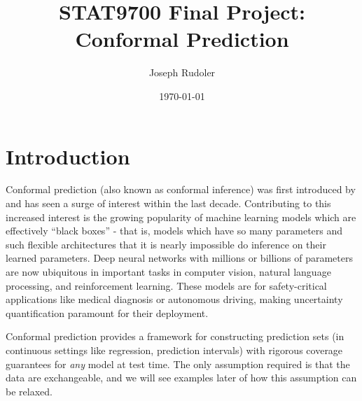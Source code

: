 \documentclass[a4paper, 12pt]{article}
\title{STAT9700 Final Project: Conformal Prediction}
\author{Joseph Rudoler}
\date{\today}
\begin{document}
\maketitle


\section{Introduction}
\label{sec:intro}
Conformal prediction (also known as conformal inference) was first introduced by \textcite{vovkMachineLearningApplicationsAlgorithmic1999} and has seen a surge of interest within the last decade. Contributing to this increased interest is the growing popularity of machine learning models which are effectively ``black boxes'' - that is, models which have so many parameters and such flexible architectures that it is nearly impossible do inference on their learned parameters. Deep neural networks with millions or billions of parameters are now ubiquitous in important tasks in computer vision, natural language processing, and reinforcement learning. These models are for safety-critical applications like medical diagnosis or autonomous driving, making uncertainty quantification paramount for their deployment.

Conformal prediction provides a framework for constructing prediction sets (in continuous settings like regression, prediction intervals) with rigorous coverage guarantees for \textit{any} model at test time. The only assumption required is that the data are exchangeable, and we will see examples later of how this assumption can be relaxed.
\end{document}
